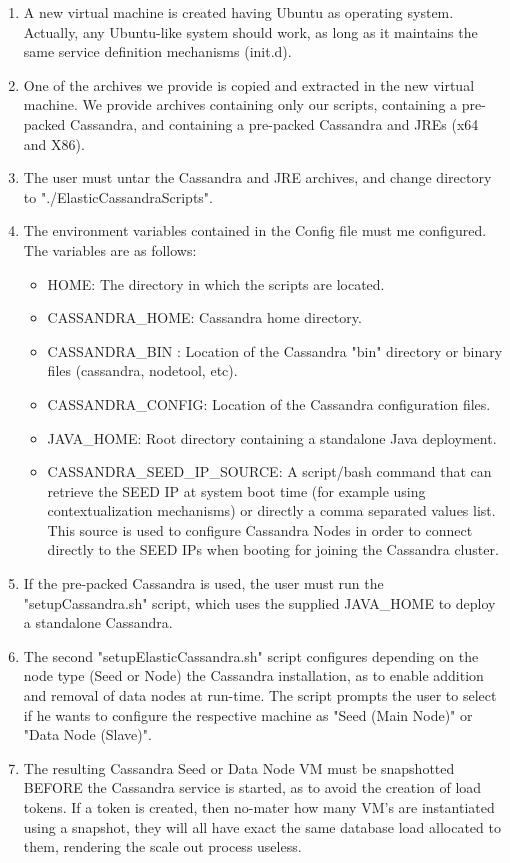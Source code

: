 \documentclass[10pt]{report}
\begin{document}
\begin{enumerate}
  \item A new virtual machine is created having Ubuntu as operating system. Actually, any Ubuntu-like system should work, as long as it maintains the same service definition mechanisms (init.d).
  \item One of the archives we provide is copied and extracted in the new virtual machine. We provide archives containing only our scripts, containing a pre-packed Cassandra, and containing a pre-packed Cassandra and JREs (x64 and X86).
  \item The user must untar the Cassandra and JRE archives, and change directory to "./ElasticCassandraScripts".
  \item The environment variables contained in the Config file must me configured. The variables are as follows:
    \begin{itemize}
    \item HOME: The directory in which the scripts are located.
    \item CASSANDRA\_HOME: Cassandra home directory.
    \item CASSANDRA\_BIN : Location of the Cassandra "bin" directory or binary files (cassandra, nodetool, etc).
    \item CASSANDRA\_CONFIG: Location of the Cassandra configuration files. 
    \item JAVA\_HOME: Root directory containing a standalone Java deployment.
     \item CASSANDRA\_SEED\_IP\_SOURCE: A script/bash command that can retrieve the SEED IP at system boot time (for example using contextualization mechanisms) or directly a comma separated values list. This source is used to configure Cassandra Nodes in order to connect directly to the SEED IPs when booting for joining the Cassandra cluster.    
    \end{itemize}  
 \item If the pre-packed Cassandra is used, the user must run the "setupCassandra.sh" script, which uses the supplied JAVA\_HOME to deploy a standalone Cassandra.
 \item The second "setupElasticCassandra.sh" script configures depending on the node type (Seed or Node) the Cassandra installation, as to enable addition and removal of data nodes at run-time. The script prompts the user to select if he wants to configure the respective machine as "Seed (Main Node)" or "Data Node (Slave)".
 \item The resulting Cassandra Seed or Data Node VM must be snapshotted BEFORE the Cassandra service is started, as to avoid the creation of load tokens. If a token is created, then no-mater how many VM's are instantiated using a snapshot, they will all have exact the same database load allocated to them, rendering the scale out process useless.

\end{enumerate}
\end{document}
